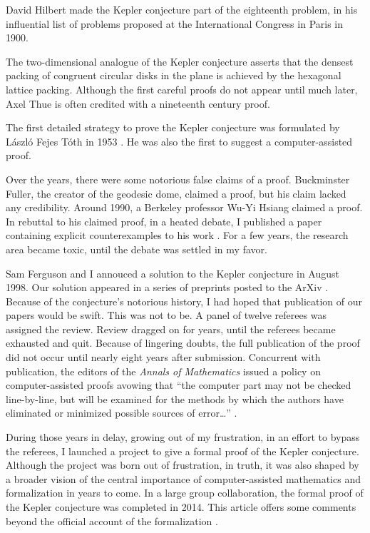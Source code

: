 \documentclass{amsart}
\begin{document}
David Hilbert made the Kepler conjecture part of the eighteenth problem, in
his influential list of problems proposed at the International
Congress in Paris in 1900.

The two-dimensional analogue of the Kepler conjecture asserts that the
densest packing of congruent circular disks in the plane is achieved
by the hexagonal lattice packing.  Although the first careful proofs
do not appear until much later, Axel Thue is often credited with a
nineteenth century proof.

The first detailed strategy to prove the Kepler conjecture was
formulated by L\'aszl\'o Fejes T\'oth in 1953 \cite{Fej53}.  He was also the
first to suggest a computer-assisted proof.

Over the years, there were some notorious false claims of a proof.
Buckminster Fuller, the creator of the geodesic dome, claimed a proof,
but his claim lacked any credibility.  Around 1990, a Berkeley
professor Wu-Yi Hsiang claimed a proof.  In rebuttal to his claimed
proof, in a heated debate, I published a paper containing explicit
counterexamples to his work \cite{Hales:1994:MI}.  For a few years,
the research area became toxic, until the debate was settled in my
favor.

Sam Ferguson and I annouced a solution to the Kepler conjecture in
August 1998.  Our solution appeared in a series of preprints posted to
the ArXiv \cite{hales1998kepler}.  Because of the conjecture's
notorious history, I had hoped that publication of our papers would be
swift. This was not to be.  A panel of twelve referees was assigned
the review. Review dragged on for years, until the referees became
exhausted and quit.  Because of lingering doubts, the full publication
of the proof did not occur until nearly eight years after submission.
%
Concurrent
with publication, the editors of the \emph{Annals of Mathematics}
issued a policy on computer-assisted proofs avowing that ``the
computer part may not be checked line-by-line, but will be examined
for the methods by which the authors have eliminated or minimized
possible sources of error\ldots'' \cite{annalsPolicy}.

During those years in delay, growing out of my frustration, in an
effort to bypass the referees, I launched a project to give a formal
proof of the Kepler conjecture.  Although the project was born out of
frustration, in truth, it was also shaped by a broader vision of the
central importance of computer-assisted mathematics and formalization
in years to come.  In a large group collaboration, the formal proof of
the Kepler conjecture was completed in 2014.
This article offers some comments beyond the official account of the
formalization  \cite{hales2017formal}.
\end{document}

